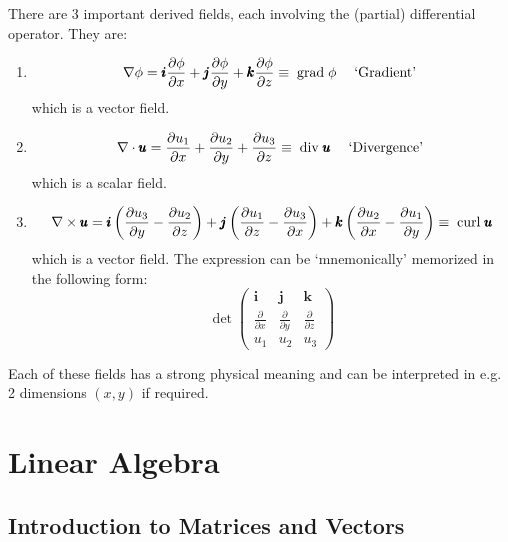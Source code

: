 \documentclass[12pt]{report}
\theoremstyle{definition}
\begin{document}
There are 3 important derived fields, each involving the (partial) differential operator. They are:
\begin{enumerate}[label = (\arabic*)]
    \item 
        \[
            \nabla \phi = \pmb{i}\frac{\partial\phi}{\partial x}
            + \pmb{j}\frac{\partial\phi}{\partial y} + \pmb{k}\frac{\partial\phi}{\partial z}
            \equiv \;\textnormal{grad}\;\phi \quad\;\textnormal{`Gradient'}\;
        \]which is a vector field.
        
    \item 
        \[
            \nabla \cdot \pmb{u} = \frac{\partial u_1}{\partial x} 
            + \frac{\partial u_2}{\partial y} + \frac{\partial u_3}{\partial z}
            \equiv \;\textnormal{div}\;\pmb{u} \quad\;\textnormal{`Divergence'}\;
        \]which is a scalar field.

    \item 
        \[
            \nabla \times \pmb{u} = \pmb{i}\left(\frac{\partial u_3}{\partial y}
            - \frac{\partial u_2}{\partial z}\right)
            + \pmb{j}\left(\frac{\partial u_1}{\partial z} - \frac{\partial u_3}{\partial x}\right)
            + \pmb{k}\left(\frac{\partial u_2}{\partial x} - \frac{\partial u_1}{\partial y}\right)
            \equiv \;\textnormal{curl}\;\pmb{u}
        \]which is a vector field.
        The expression can be `mnemonically' memorized in the following form:\[
            \det{\begin{pmatrix}
                    \pmb{i} & \pmb{j} & \pmb{k} \\
                    \frac{\partial}{\partial x} & \frac{\partial}{\partial y} & \frac{\partial}{\partial z} \\
                    u_1 & u_2 & u_3
            \end{pmatrix} }
        \]
\end{enumerate}

Each of these fields has a strong physical meaning and can be interpreted in
e.g. 2 dimensions $(x,y)$ if required.






\chapter{Linear Algebra}

\section{Introduction to Matrices and Vectors}
\end{document}
